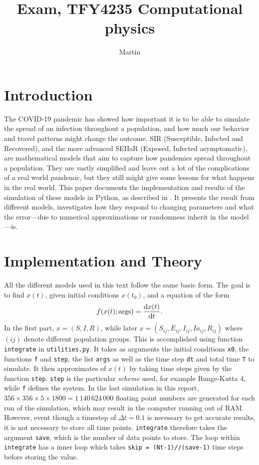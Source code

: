 \documentclass{article}
\title{Exam, TFY4235 Computational physics}
\author{Martin}
\date{}
\begin{document}
    \maketitle
    \section*{Introduction}
    The COVID-19 pandemic has showed how important it is to be able to simulate the spread of an infection throughout a population, and how much our behavior and travel patterns might change the outcome.
    SIR (Susceptible, Infected and Recovered), and the more advanced SEIIaR (Exposed, Infected asymptomatic), are mathematical models that aim to capture how pandemics spread throughout a population.
    They are vastly simplified and leave out a lot of the complications of a real world pandemic, but they still might give some lessons for what happens in the real world.
    This paper documents the implementation and results of the simulation of these models in Python, as described in \cite{exam}.
    It presents the result from different models, investigates how they respond to changing parameters and what the error---due to numerical approximations or randomness inherit in the model---is.

    \section*{Implementation and Theory}
    All the different models used in this text follow the same basic form. 
    The goal is to find $x(t)$, given initial conditions $x(t_0)$, and a equation of the form
    \begin{equation*}
        f(x(t); \mathrm{args}) = \dv{x(t)}{t}.
    \end{equation*}
    In the first part, $x = (S, I, R)$, while later $x = (S_{ij}, E_{ij}, I_{ij}, Ia_{ij}, R_{ij})$ where $(ij)$ denote different population groups. 
    This is accomplished using function \verb|integrate| in \verb|utilities.py|. 
    It takes as arguments the initial conditions \verb|x0|, the functions \verb|f| and \verb|step|, the list \verb|args| as well as the time step \verb|dt| and total time \verb|T| to simulate. 
    It then approximates of $x(t)$ by taking time steps given by the function \verb|step|. 
    \verb|step| is the particular \emph{scheme} used, for example Runge-Kutta 4, while \verb|f| defines the system. In the last simulation in this report, $356\times356\times5\times1800=1\,140\,624\,000$ floating point numbers are generated for each run of the simulation, which may result in the computer running out of RAM.
    However, event though a timestep of $\Delta t = 0.1$ is necessary to get accurate results, it is not necessary to store all time points.
    \verb|integrate| therefore takes the argument \verb|save|, which is the number of data points to store.
    The loop within \verb|integrate| has a inner loop which takes \verb|skip = (Nt-1)//(save-1)| time steps before storing the value.
    
\end{document}
